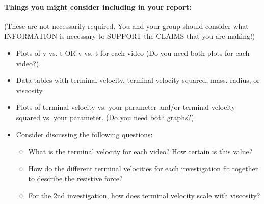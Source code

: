 \paragraph{Things you might consider including in your report:}
(These are not necessarily required. You and your group should consider what INFORMATION is necessary to SUPPORT the CLAIMS that you are making!)
\begin{itemize}
\item Plots of y vs. t OR v vs. t for each video (Do you need both plots for each video?).
\item Data tables with terminal velocity, terminal velocity squared, mass, radius, or viscosity.
\item Plots of terminal velocity vs. your parameter and/or terminal velocity squared vs. your parameter. (Do you need both graphs?)
\item Consider discussing the following questions:
	\begin{itemize}
	\item What is the terminal velocity for each video? How certain is this value?
	\item How do the different terminal velocities for each investigation fit together to describe the resistive force?
	\item For the 2nd investigation, how does terminal velocity scale with viscosity?
	\end{itemize}
\end{itemize}

\begin{table}[h]
\centering
{}
\caption{Viscosity of glycerin concentrations by \% volume}
\label{tab:viscosity}
\end{table}


